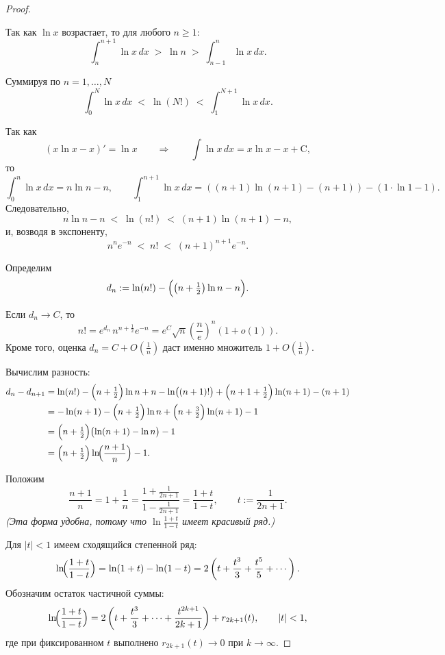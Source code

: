 \begin{proof}
\begin{center}
	\end{center}
	
	Так как $\ln x$ возрастает, то для любого $n\ge1$:
	\[
	\int_{n}^{n+1}\ln x\,dx \;>\; \ln n \;>\; \int_{n-1}^{n}\ln x\,dx .
	\]
	
	Суммируя по $n=1,\dots,N$
	\[
	\int_{0}^{N}\ln x\,dx \;<\; \ln(N!) \;<\; \int_{1}^{N+1}\ln x\,dx .
	\]
	
	Так как
	\[
	(x\ln x - x)' = \ln x
	\qquad\Rightarrow\qquad
	\int \ln x\,dx = x\ln x - x + \mathrm{C},
	\]
	то
	\[
	\int_{0}^{n}\ln x\,dx = n\ln n-n,
	\qquad
	\int_{1}^{n+1}\ln x\,dx = ((n+1)\ln(n+1) - (n+1)) - (1 \cdot \ln1 - 1).
	\]
	Следовательно,
	\[
	n\ln n - n \;<\; \ln(n!) \;<\; (n+1)\ln(n+1) - n,
	\]
	и, возводя в экспоненту,
	\[
	n^n e^{-n} \;<\; n! \;<\; (n+1)^{n+1} e^{-n}.
	\]
	
	Определим
	\[
	d_n := \ln(n!) - \Bigl(\bigl(n+\tfrac12\bigr)\ln n - n\Bigr).
	\]

	Если $d_n\to C$, то
		\[
		n! = e^{d_n}\, n^{n+\frac12}e^{-n}
		= e^{C}\sqrt{n}\left(\frac{n}{e}\right)^n(1+o(1)).
		\]
	Кроме того, оценка $d_n=C+O\left(\tfrac1n\right)$ даст именно множитель $1+O\left(\tfrac1n\right)$.
	
	Вычислим разность:
	\begin{align*}
		d_n-d_{n+1}
		&= \ln(n!) - \Bigl(n+\tfrac12\Bigr)\ln n + n
		- \ln\bigl((n+1)!\bigr) + \Bigl(n+1+\tfrac12\Bigr)\ln(n+1) - (n+1) \\
		&= -\ln(n+1)
		- \Bigl(n+\tfrac12\Bigr)\ln n
		+ \Bigl(n+\tfrac32\Bigr)\ln(n+1) - 1 \\
		&= \Bigl(n+\tfrac12\Bigr)\bigl(\ln(n+1)-\ln n\bigr)-1 \\
		&= \Bigl(n+\tfrac12\Bigr)\ln\!\Bigl(\frac{n+1}{n}\Bigr)-1.
	\end{align*}
	
	Положим
	\[
	\frac{n+1}{n}=1+\frac1n
	= \frac{1+\frac1{2n+1}}{1-\frac1{2n+1}}
	= \frac{1+t}{1-t},
	\qquad t:=\frac{1}{2n+1}.
	\]
	\emph{(Эта форма удобна, потому что $\ln\frac{1+t}{1-t}$ имеет красивый ряд.)}
	
	Для $|t|<1$ имеем сходящийся степенной ряд:
	\[
	\ln\!\Bigl(\frac{1+t}{1-t}\Bigr)
	= \ln(1+t)-\ln(1-t)
	= 2\left(t+\frac{t^3}{3}+\frac{t^5}{5}+\cdots\right).
	\]
	Обозначим остаток частичной суммы:
	\[
	\ln\!\Bigl(\frac{1+t}{1-t}\Bigr)
	= 2\left(t+\frac{t^3}{3}+\cdots+\frac{t^{2k+1}}{2k+1}\right)+r_{2k+1}(t),
	\qquad |t|<1,
	\]
	где при фиксированном $t$ выполнено $r_{2k+1}(t)\to0$ при $k\to\infty$.
	

\end{proof}
